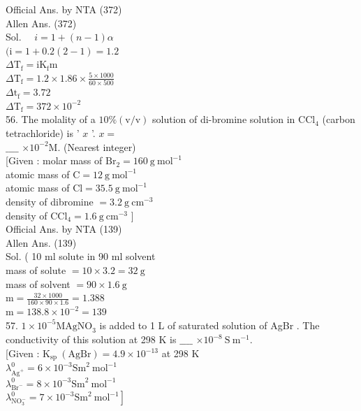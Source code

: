 \documentclass[10pt]{article}
\begin{document}
Official Ans. by NTA (372)\\
Allen Ans. (372)\\
Sol. \(\quad i=1+(n-1) \alpha\)\\
\((\mathrm{i}=1+0.2(2-1)=1.2\)\\
\(\Delta \mathrm{T}_{\mathrm{f}}=\mathrm{i} \mathrm{K}_{\mathrm{f}} \mathrm{m}\)\\
\(\Delta \mathrm{T}_{\mathrm{f}}=1.2 \times 1.86 \times \frac{5 \times 1000}{60 \times 500}\)\\
\(\Delta \mathrm{t}_{\mathrm{f}}=3.72\)\\
\(\Delta \mathrm{T}_{\mathrm{f}}=372 \times 10^{-2}\)\\
56. The molality of a \(10 \%(\mathrm{v} / \mathrm{v})\) solution of di-bromine solution in \(\mathrm{CCl}_{4}\) (carbon tetrachloride) is ' \(x\) '. \(x=\)\\
\(\_\_\_\_\) \(\times 10^{-2} \mathrm{M}\). (Nearest integer)\\[0pt]
[Given : molar mass of \(\mathrm{Br}_{2}=160 \mathrm{~g} \mathrm{~mol}^{-1}\)\\
atomic mass of \(\mathrm{C}=12 \mathrm{~g} \mathrm{~mol}^{-1}\)\\
atomic mass of \(\mathrm{Cl}=35.5 \mathrm{~g} \mathrm{~mol}^{-1}\)\\
density of dibromine \(=3.2 \mathrm{~g} \mathrm{~cm}^{-3}\)\\
density of \(\mathrm{CCl}_{4}=1.6 \mathrm{~g} \mathrm{~cm}^{-3}\) ]\\
Official Ans. by NTA (139)\\
Allen Ans. (139)\\
Sol. ( 10 ml solute in 90 ml solvent\\
mass of solute \(=10 \times 3.2=32 \mathrm{~g}\)\\
mass of solvent \(=90 \times 1.6 \mathrm{~g}\)\\
\(\mathrm{m}=\frac{32 \times 1000}{160 \times 90 \times 1.6}=1.388\)\\
\(\mathrm{m}=138.8 \times 10^{-2}=139\)\\
57. \(1 \times 10^{-5} \mathrm{M} \mathrm{AgNO}_{3}\) is added to 1 L of saturated solution of AgBr . The conductivity of this solution at 298 K is \(\_\_\_\_\) \(\times 10^{-8} \mathrm{~S} \mathrm{~m}^{-1}\).\\[0pt]
[Given : \(\mathrm{K}_{\text {sp }}(\mathrm{AgBr})=4.9 \times 10^{-13}\) at 298 K\\
\(\lambda_{\mathrm{Ag}^{+}}^{0}=6 \times 10^{-3} \mathrm{Sm}^{2} \mathrm{~mol}^{-1}\)\\
\(\lambda_{\mathrm{Br}^{-}}^{0}=8 \times 10^{-3} \mathrm{Sm}^{2} \mathrm{~mol}^{-1}\)\\
\(\left.\lambda_{\mathrm{NO}_{3}^{-}}^{0}=7 \times 10^{-3} \mathrm{Sm}^{2} \mathrm{~mol}^{-1}\right]\)
\end{document}
